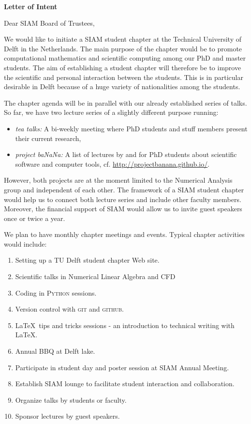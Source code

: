 \documentclass[letterpaper,12pt]{letter}
\begin{document}
\begin{letter}{\textbf{Letter of Intent}}

\opening{Dear SIAM Board of Trustees,}

We would like to initiate a SIAM student chapter at the Technical University of Delft in the Netherlands. The main purpose of the chapter would be to promote computational mathematics and scientific computing among our PhD and master students. The aim of establishing a student chapter will therefore be to improve the scientific and personal interaction between the students. This is in particular desirable in Delft because of a huge variety of nationalities among the students. 

The chapter agenda will be in parallel with our already established series of talks. So far, we have two lecture series of a slightly different purpose running:
\begin{itemize}
 \item \textit{tea talks:} A bi-weekly meeting where PhD students and stuff members present their current research,
 \item \textit{project baNaNa:} A list of lectures by and for PhD students about scientific software and computer tools, cf. \href{http://projectbanana.github.io/}{http://projectbanana.github.io/}.
\end{itemize}
However, both projects are at the moment limited to the Numerical Analysis group and independent of each other. The framework of a SIAM student chapter would help us to connect both lecture series and include other faculty members. Moreover, the financial support of SIAM would allow us to invite guest speakers once or twice a year.

We plan to have monthly chapter meetings and events. Typical chapter activities would include:
\begin{enumerate}
\item Setting up a TU Delft student chapter Web site.
\item Scientific talks in Numerical Linear Algebra and CFD
\item Coding in \textsc{Python} sessions.
\newpage
\item Version control with \textsc{git} and \textsc{github}.
\item \LaTeX \ tips and tricks sessions - an introduction to technical writing with \LaTeX.
\item Annual BBQ at Delft lake.
\item Participate in student day and poster session at SIAM Annual Meeting.
\item Establish SIAM lounge to facilitate student interaction and collaboration.
\item Organize talks by students or faculty.
\item Sponsor lectures by guest speakers.
\end{enumerate}


\end{letter}
\end{document}
